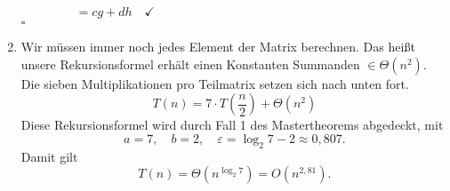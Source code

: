 \documentclass[a4paper,10pt]{scrartcl}
\begin{document}
\begin{enumerate}
        \begin{align*}
                    &= cg + dh \quad \checkmark \qquad \qquad \qquad \qquad \qquad \qquad \qquad \qquad \qquad \qquad
        \end{align*}\hfill $\square$
\item   Wir müssen immer noch jedes Element der Matrix berechnen. Das heißt unsere Rekursionsformel erhält einen Konstanten Summanden $\in \Theta(n^2)$. Die sieben Multiplikationen pro Teilmatrix setzen sich nach unten fort.
        \[
         T(n) = 7 \cdot T\left(\frac{n}{2}\right) + \Theta(n^2)
        \]
        Diese Rekursionsformel wird durch Fall 1 des Mastertheorems abgedeckt, mit 
        \[a = 7,\quad b = 2,\quad \varepsilon = \log_2 7 - 2 \approx 0{,}807.\]
        Damit gilt
        \[T(n) = \Theta\left(n^{\log_2 7}\right) = O\left(n^{2{,}81}\right).\]
\end{enumerate}
\end{document}
